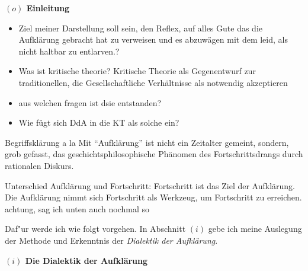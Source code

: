 \documentclass[a4paper, 12pt]{article}
\begin{document}
\begin{onehalfspace} 

\noindent\textbf{$(o)$ Einleitung}

\noindent 

\begin{itemize}

\item Ziel meiner Darstellung soll sein, den Reflex, auf alles Gute das die Aufklärung gebracht hat zu verweisen und es abzuwägen mit dem leid, als nicht haltbar zu entlarven.?
   \item Was ist kritische theorie? Kritische Theorie als Gegenentwurf zur traditionellen, die Gesellschaftliche Verhältnisse als notwendig akzeptieren
  \item aus welchen fragen ist dsie entstanden?
  \item Wie fügt sich DdA in die KT als solche ein?
\end{itemize}

Begriffsklärung a la Mit "`Aufklärung"' ist nicht ein Zeitalter gemeint, sondern, grob gefasst, das geschichtsphilosophische Phänomen des Fortschrittsdrangs durch rationalen Diskurs.

Unterschied Aufklärung und Fortschritt: Fortschritt ist das Ziel der Aufklärung. Die Aufklärung nimmt sich Fortschritt als Werkzeug, um Fortschritt zu erreichen. achtung, sag ich unten auch nochmal so


Daf"ur werde ich wie folgt vorgehen. In Abschnitt $(i)$ gebe ich meine Auslegung der Methode und Erkenntnis der \emph{Dialektik der Aufklärung}. 

\vspace{5mm}


\noindent\textbf{$(i)$ Die Dialektik der Aufklärung}


\end{onehalfspace}
\end{document}
